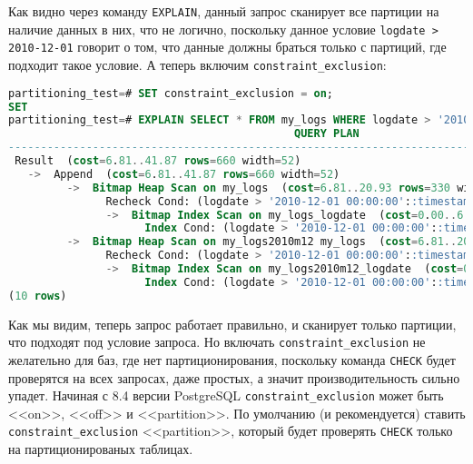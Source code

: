 Как видно через команду \lstinline!EXPLAIN!, данный запрос сканирует все партиции на наличие данных в них, что не логично, поскольку данное условие \lstinline!logdate > 2010-12-01! говорит о том, что данные должны браться только с партиций, где подходит такое условие. А теперь включим \lstinline!constraint_exclusion!:

\begin{lstlisting}[language=SQL,label=lst:partitioning15,caption=<<constraint\_exclusion>> ON]
partitioning_test=# SET constraint_exclusion = on;
SET
partitioning_test=# EXPLAIN SELECT * FROM my_logs WHERE logdate > '2010-12-01';
                                            QUERY PLAN
---------------------------------------------------------------------------------------------------
 Result  (cost=6.81..41.87 rows=660 width=52)
   ->  Append  (cost=6.81..41.87 rows=660 width=52)
         ->  Bitmap Heap Scan on my_logs  (cost=6.81..20.93 rows=330 width=52)
               Recheck Cond: (logdate > '2010-12-01 00:00:00'::timestamp without time zone)
               ->  Bitmap Index Scan on my_logs_logdate  (cost=0.00..6.73 rows=330 width=0)
                     Index Cond: (logdate > '2010-12-01 00:00:00'::timestamp without time zone)
         ->  Bitmap Heap Scan on my_logs2010m12 my_logs  (cost=6.81..20.93 rows=330 width=52)
               Recheck Cond: (logdate > '2010-12-01 00:00:00'::timestamp without time zone)
               ->  Bitmap Index Scan on my_logs2010m12_logdate  (cost=0.00..6.73 rows=330 width=0)
                     Index Cond: (logdate > '2010-12-01 00:00:00'::timestamp without time zone)
(10 rows)
\end{lstlisting}

Как мы видим, теперь запрос работает правильно, и сканирует только партиции, что подходят под условие запроса. Но включать \lstinline!constraint_exclusion! не желательно для баз, где нет партиционирования, поскольку команда \lstinline!CHECK! будет проверятся на всех запросах, даже простых, а значит производительность сильно упадет. Начиная с 8.4 версии PostgreSQL \lstinline!constraint_exclusion! может быть <<on>>, <<off>> и <<partition>>. По умолчанию (и рекомендуется) ставить \lstinline!constraint_exclusion! <<partition>>, который будет проверять \lstinline!CHECK! только на партиционированых таблицах.
